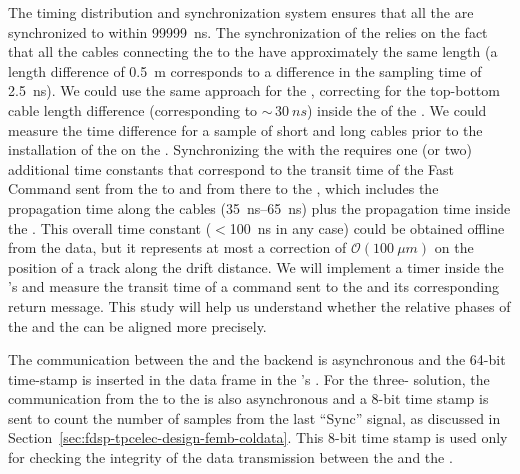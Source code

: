 
The timing distribution and synchronization system ensures that
all the  are synchronized to within \SI{99999}{ns}. %
 The synchronization of the   relies on
the fact that all the cables connecting the  to the
 have approximately the same length (a length 
difference of \SI{0.5}{m} corresponds to a difference in the
sampling time of \SI{2.5}{ns}). We could use the same approach %
for the  , correcting %
for the top-bottom  cable length difference (corresponding to $\sim\,\SI{30}{ns}$) %
inside the  of the .  
We could measure the time difference for a sample of short and long cables prior to the installation of the  on
the . %
Synchronizing
 the  with the  requires one (or two)
additional time constants that correspond to the transit 
time of the Fast Command sent from the  to
 and from there to the ,
which includes the propagation time along the cables
(\SIrange{35}{65}{ns}) plus the propagation time inside
the . This overall time constant  %
($<$\SI{100}{ns} in any case) could be obtained offline
from the data, but it represents at most a correction
of $\mathcal{O}(\SI{100}{\mu m})$ on the position of
a track along the drift distance. %
We will implement a timer inside the 's  
 and measure the transit time of a command
sent to the  and its corresponding return
message. This study will help us understand whether the 
relative phases of the and the  
can be aligned more precisely.

The communication between the
 and the  backend is asynchronous
and %
the \num{64}-bit time-stamp is inserted in the data frame
in the 's . %
For the three- solution, the communication
from the  to the  is also
asynchronous and a \num{8}-bit time stamp is sent to
count the number of  samples from the last
``Sync'' signal, as discussed in Section~\ref{sec:fdsp-tpcelec-design-femb-coldata}.
This \num{8}-bit time stamp is used only for checking
the integrity of the data transmission between the 
 and the . 

